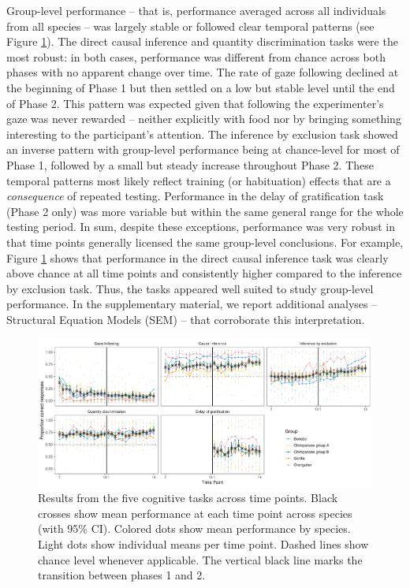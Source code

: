 \documentclass[
  man,floatsintext]{apa6}
\begin{document}
Group-level performance -- that is, performance averaged across all individuals from all species -- was largely stable or followed clear temporal patterns (see Figure \ref{fig:perfplot}). The direct causal inference and quantity discrimination tasks were the most robust: in both cases, performance was different from chance across both phases with no apparent change over time. The rate of gaze following declined at the beginning of Phase 1 but then settled on a low but stable level until the end of Phase 2. This pattern was expected given that following the experimenter's gaze was never rewarded -- neither explicitly with food nor by bringing something interesting to the participant's attention. The inference by exclusion task showed an inverse pattern with group-level performance being at chance-level for most of Phase 1, followed by a small but steady increase throughout Phase 2. These temporal patterns most likely reflect training (or habituation) effects that are a \emph{consequence} of repeated testing. Performance in the delay of gratification task (Phase 2 only) was more variable but within the same general range for the whole testing period. In sum, despite these exceptions, performance was very robust in that time points generally licensed the same group-level conclusions. For example, Figure \ref{fig:perfplot} shows that performance in the direct causal inference task was clearly above chance at all time points and consistently higher compared to the inference by exclusion task. Thus, the tasks appeared well suited to study group-level performance. In the supplementary material, we report additional analyses -- Structural Equation Models (SEM) -- that corroborate this interpretation.

\begin{figure}
\includegraphics[width=1\linewidth]{./figures/performance} \caption{Results from the five cognitive tasks across time points. Black crosses show mean performance at each time point across species (with 95\% CI). Colored dots show mean performance by species. Light dots show individual means per time point. Dashed lines show chance level whenever applicable. The vertical black line marks the transition between phases 1 and 2.}\label{fig:perfplot}
\end{figure}
\end{document}
